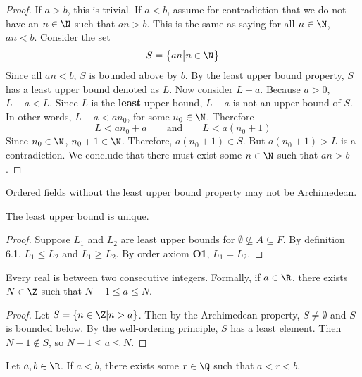 \documentclass[10pt]{article}
\begin{document}
\begin{proof}
    If $a>b$, this is trivial. If $a<b$, assume for contradiction that we do not have an $n\in\N$ such that $an>b$. This is the same as saying for all $n\in\N$, $an<b$. Consider the set 
    $$
        S=\left\{an\big|n\in\N\right\}
    $$
    Since all $an<b$, $S$ is bounded above by $b$. By the least upper bound property, $S$ has a least upper bound denoted as $L$. Now consider $L-a$. Because $a>0$, $L-a<L$. Since $L$ is the \textbf{least} upper bound, $L-a$ is not an upper bound of $S$. In other words, $L-a<an_0$, for some $n_0\in\N$. Therefore
    \[
        L<an_0+a \qquad \text{and}\qquad L<a(n_0+1)
    \]
    Since $n_0\in\N$, $n_0+1\in\N$. Therefore, $a(n_0+1)\in S$. But $a(n_0+1)>L$ is a contradiction. We conclude that there must exist some $n\in\N$ such that $an>b$.
\end{proof}
\begin{remark}
    Ordered fields without the least upper bound property may not be Archimedean.
\end{remark}
\begin{proposition}
    The least upper bound is unique. 
\end{proposition}
\begin{proof}
    Suppose $L_1$ and $L_2$ are least upper bounds for $\emptyset \nsubseteq A\subseteq F$. By definition 6.1, $L_1\leq L_2$ and $L_1\geq L_2$. By order axiom \textbf{O1}, $L_1=L_2$.
\end{proof}
\begin{proposition}
    Every real is between two consecutive integers. Formally, if $a\in\R$, there exists $N\in\Z$ such that $N-1\leq a\leq N$.
\end{proposition}
\begin{proof}
    Let $S=\{n\in\Z|n>a\}$. Then by the Archimedean property, $S\neq \emptyset$ and $S$ is bounded below. By the well-ordering principle, $S$ has a least element. Then $N-1\notin S$, so $N-1\leq a\leq N$.
\end{proof}
\begin{theorem}
    Let $a,b\in \R$. If $a<b$, there exists some $ r\in\Q$ such that $a<r<b$.
\end{theorem}
\end{document}
